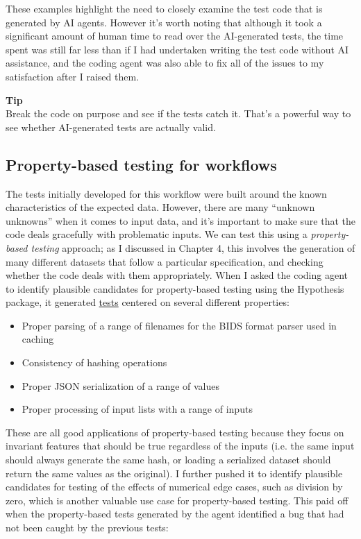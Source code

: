 These examples highlight the need to closely examine the test code that is generated by AI agents.  However it's worth noting that although it took a significant amount of human time to read over the AI-generated tests, the time spent was still far less than if I had undertaken writing the test code without AI assistance, and the coding agent was also able to fix all of the issues to my satisfaction after I raised them. 

\begin{framed}
\textbf{Tip}\\
Break the code on purpose and see if the tests catch it.  That's a powerful way to see whether AI-generated tests are actually valid.
\end{framed}

\subsection{Property-based testing for workflows}

The tests initially developed for this workflow were built around the known characteristics of the expected data. However, there are many ``unknown unknowns'' when it comes to input data, and it's important to make sure that the code deals gracefully with problematic inputs. We can test this using a \textit{property-based testing} approach; as I discussed in Chapter 4, this involves the generation of many different datasets that follow a particular specification, and checking whether the code deals with them appropriately.  When I asked the coding agent to identify plausible candidates for property-based testing using the Hypothesis package, it generated \href{https://github.com/BetterCodeBetterScience/example-rnaseq/blob/main/tests/test\_hypothesis.py}{tests} centered on several different properties:

\begin{itemize}
\item Proper parsing of a range of filenames for the BIDS format parser used in caching
\item Consistency of hashing operations
\item Proper JSON serialization of a range of values
\item Proper processing of input lists with a range of inputs
\end{itemize}

These are all good applications of property-based testing because they focus on invariant features that should be true regardless of the inputs (i.e. the same input should always generate the same hash, or loading a serialized dataset should return the same values as the original). I further pushed it to identify plausible candidates for testing of the effects of numerical edge cases, such as division by zero, which is another valuable use case for property-based testing. This paid off when the property-based tests generated by the agent identified a bug that had not been caught by the previous tests:

